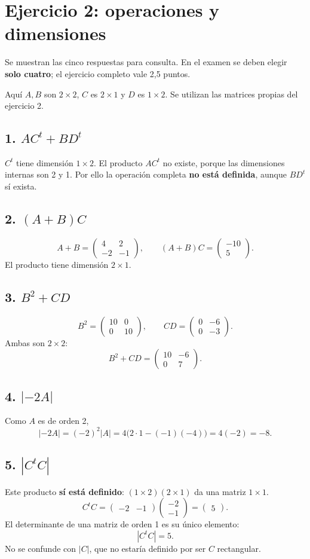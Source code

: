 \documentclass[11pt]{article}
\begin{document}
\section*{Ejercicio 2: operaciones y dimensiones}
Se muestran las cinco respuestas para consulta. En el examen se deben elegir \textbf{solo cuatro}; el ejercicio completo vale 2,5 puntos.

Aquí $A,B$ son $2\times2$, $C$ es $2\times1$ y $D$ es $1\times2$. Se utilizan las matrices propias del ejercicio 2.
\subsection*{1. $AC^t+BD^t$}
$C^t$ tiene dimensión $1\times2$. El producto $AC^t$ no existe, porque las dimensiones internas son 2 y 1. Por ello la operación completa \textbf{no está definida}, aunque $BD^t$ sí exista.
\subsection*{2. $(A+B)C$}
\[
A+B=\begin{pmatrix}4&2\\-2&-1\end{pmatrix},\qquad
\boxed{(A+B)C=\begin{pmatrix}-10\\5\end{pmatrix}}.
\]
El producto tiene dimensión $2\times1$.
\subsection*{3. $B^2+CD$}
\[
B^2=\begin{pmatrix}10&0\\0&10\end{pmatrix},\qquad
CD=\begin{pmatrix}0&-6\\0&-3\end{pmatrix}.
\]
Ambas son $2\times2$:
\[\boxed{B^2+CD=\begin{pmatrix}10&-6\\0&7\end{pmatrix}}.\]
\subsection*{4. $|-2A|$}
Como $A$ es de orden 2,
\[|-2A|=(-2)^2|A|=4\bigl(2\cdot1-(-1)(-4)\bigr)=4(-2)=\boxed{-8}.\]
\subsection*{5. $|C^tC|$}
Este producto \textbf{sí está definido}: $(1\times2)(2\times1)$ da una matriz $1\times1$.
\[C^tC=\begin{pmatrix}-2&-1\end{pmatrix}\begin{pmatrix}-2\\-1\end{pmatrix}=\begin{pmatrix}5\end{pmatrix}.\]
El determinante de una matriz de orden 1 es su único elemento:
\[\boxed{|C^tC|=5}.\]
No se confunde con $|C|$, que no estaría definido por ser $C$ rectangular.
\clearpage
\end{document}

